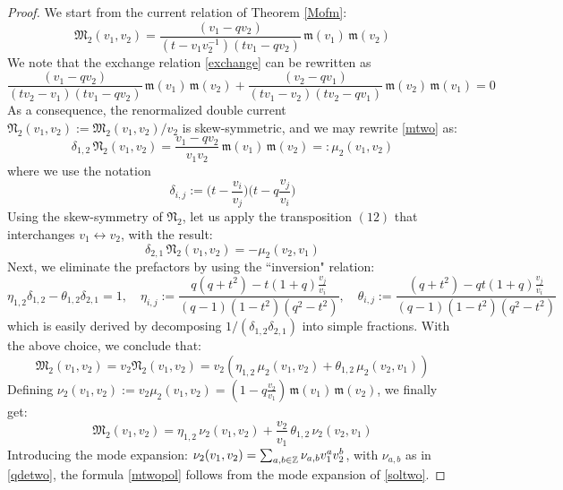 \begin{proof}
We start from the current relation of Theorem \ref{Mofm}:
\begin{equation}\label{mtwo}
{\mathfrak M}_2(v_1,v_2)=\frac{(v_1-q v_2)}{(t -v_1 v_2^{-1})(t v_1-q  v_2)}
\,{\mathfrak m}(v_1)\,{\mathfrak m}(v_2)
\end{equation}
We note that the exchange relation \eqref{exchange} can be rewritten as
$$\frac{(v_1-q v_2)}{(t v_2 -v_1)(t v_1-q  v_2)}
\,{\mathfrak m}(v_1)\,{\mathfrak m}(v_2)+\frac{(v_2-q v_1)}{(t v_1 -v_2)(t v_2-q  v_1)}
\,{\mathfrak m}(v_2)\,{\mathfrak m}(v_1)=0$$
As a consequence, the renormalized double current ${\mathfrak N}_2(v_1,v_2):={\mathfrak M}_2(v_1,v_2)/v_2$
is skew-symmetric, and we may rewrite \eqref{mtwo} as:
\begin{equation}\label{none}
\delta_{1,2}\,  {\mathfrak N}_2(v_1,v_2)
=\frac{v_1-q v_2}{v_1v_2} \,{\mathfrak m}(v_1)\,{\mathfrak m}(v_2)=:\mu_2(v_1,v_2) 
\end{equation}
where we use the notation
$$\delta_{i,j}:= \Big(t-\frac{v_i}{v_j}\Big)\Big(t-q \frac{v_j}{v_i}\Big)$$
Using the skew-symmetry of ${\mathfrak N}_2$, let us apply the transposition $(12)$ that interchanges 
$v_1\leftrightarrow v_2$, with the result:
\begin{equation}\label{ntwo}
\delta_{2,1}\,  {\mathfrak N}_2(v_1,v_2)=-\mu_2(v_2,v_1) 
\end{equation}
Next, we eliminate the prefactors by using the ``inversion" relation:
\begin{equation}\label{inverela}
\eta_{1,2}\delta_{1,2}-\theta_{1,2}\delta_{2,1}=1,\quad \eta_{i,j}:=\frac{q(q+t^2)-t(1+q)\frac{v_j}{v_i}}{(q-1)(1-t^2)(q^2-t^2)},
\quad \theta_{i,j}:=\frac{(q+t^2)-qt(1+q)\frac{v_j}{v_i}}{(q-1)(1-t^2)(q^2-t^2)}
\end{equation}
which is easily derived by decomposing $1/(\delta_{1,2}\delta_{2,1})$ into simple fractions. 
With the above choice, we conclude that:
$${\mathfrak M}_2(v_1,v_2)= v_2 {\mathfrak N}_2(v_1,v_2)
=v_2(\eta_{1,2}\, \mu_2(v_1,v_2)+\theta_{1,2}\, \mu_2(v_2,v_1))$$
Defining $\nu_2(v_1,v_2):=v_2 \mu_2(v_1,v_2)=\left(1-q\frac{v_2}{v_1}\right) \,{\mathfrak m}(v_1)\,{\mathfrak m}(v_2)$,
we finally get:
\begin{equation}\label{soltwo}
{\mathfrak M}_2(v_1,v_2)=\eta_{1,2}\, \nu_2(v_1,v_2)+\frac{v_2}{v_1}\,\theta_{1,2}\, \nu_2(v_2,v_1)
\end{equation}
Introducing the mode expansion: $\nu_2(v_1,v_2)=\sum_{a,b\in {\mathbb Z}} \nu_{a,b} v_1^a v_2^b$, with
$\nu_{a,b}$ as in \eqref{qdetwo}, the formula \eqref{mtwopol} follows from the mode expansion of \eqref{soltwo}.
\end{proof}

